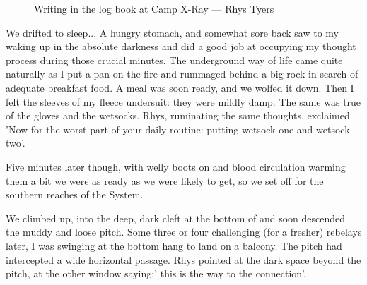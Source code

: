\begin{figure}[t]
\checkoddpage \ifoddpage \forcerectofloat \else \forceversofloat \fi
\centering
{}
\caption{Writing in the log book at Camp X-Ray --- Rhys Tyers}
\label{Camp X-Ray}
\end{figure}

We drifted to sleep... A hungry stomach, and somewhat sore back saw to my waking up in the absolute darkness and did a good job at occupying my thought process during those crucial minutes. The underground way of life came quite naturally as I put a pan on the fire and rummaged behind a big rock in search of adequate breakfast food. A meal was soon ready, and we wolfed it down. Then I felt the sleeves of my fleece undersuit: they were mildly damp. The same was true of the gloves and the wetsocks. Rhys, ruminating the same thoughts, exclaimed 'Now for the worst part of your daily routine: putting wetsock one and wetsock two'. 

 Five minutes later though, with welly boots on and blood circulation warming them a bit we were as ready as we were likely to get, so we set off for the southern reaches of the System. 
 


We climbed up, into the deep, dark cleft at the bottom of  and soon descended the muddy and loose  pitch. Some three or four challenging (for a fresher) rebelays later, I was swinging at the bottom hang to land on a balcony. The pitch had intercepted a wide horizontal passage. Rhys pointed at the dark space beyond the pitch, at the other window saying:' this is the way to the connection'. 


